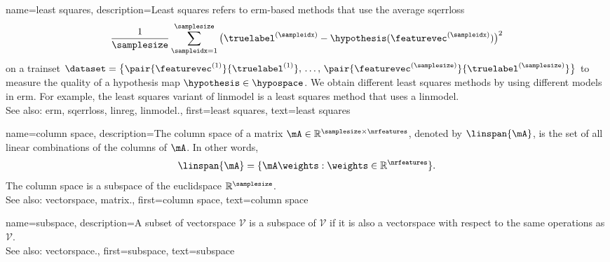 {name={least squares},
 description={Least squares refers to \gls{erm}-based 
               methods that use the average \gls{sqerrloss} 
			   $$ \frac{1}{\samplesize} \sum_{\sampleidx=1}^{\samplesize} \big( \truelabel^{(\sampleidx)} 
			   - \hypothesis(\featurevec^{(\sampleidx)}) \big)^{2} $$   
			   on a \gls{trainset} $\dataset = \big\{ \pair{\featurevec^{(1)}}{\truelabel^{(1)}}, \,\ldots, \,
			   \pair{\featurevec^{(\samplesize)}}{\truelabel^{(\samplesize)}} \big\}$	
			   to measure the quality of a \gls{hypothesis} \gls{map} $\hypothesis \in \hypospace$. 
			   We obtain different least squares methods by using different \glspl{model} 
			   in \gls{erm}. For example, the least squares variant of \gls{linmodel} 
			   is a least squares method that uses a \gls{linmodel}.
			   \\
		See also: \gls{erm}, \gls{sqerrloss}, \gls{linreg}, \gls{linmodel}.},
	first={least squares},
	text={least squares}
}

{name={column space},
 description={The column space of a \gls{matrix} 
                 $\mA \in \mathbb{R}^{\samplesize \times \nrfeatures}$,
			   denoted by $\linspan{\mA}$, is the set of all linear combinations of the 
			   columns of $\mA$. In other words, 
			   $$ \linspan{\mA} = \{ \mA \weights : \weights \in \mathbb{R}^{\nrfeatures} \}. $$
			   The column space is a subspace of the \gls{euclidspace} $\mathbb{R}^{\samplesize}$.
			   \\
		See also: \gls{vectorspace}, \gls{matrix}.},
	first={column space},
	text={column space}
}

{name={subspace},
 description={A subset of \gls{vectorspace} $\mathcal{V}$ is a subspace of $\mathcal{V}$ if it is also a 
			   \gls{vectorspace} with respect to the same operations as $\mathcal{V}$.
			   \\
		See also: \gls{vectorspace}.},
	first={subspace},
	text={subspace}
}


